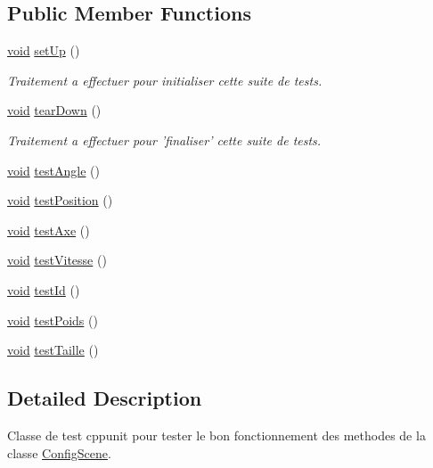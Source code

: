 \subsection*{Public Member Functions}
\begin{DoxyCompactItemize}
\item 
\hyperlink{wglew_8h_aeea6e3dfae3acf232096f57d2d57f084}{void} \hyperlink{group__inf2990_ga852614152af5bbd1217eb9daeccb0853}{set\-Up} ()
\begin{DoxyCompactList}\small\item\em Traitement a effectuer pour initialiser cette suite de tests. \end{DoxyCompactList}\item 
\hyperlink{wglew_8h_aeea6e3dfae3acf232096f57d2d57f084}{void} \hyperlink{group__inf2990_gadbbaf2e4b333b96d17c8c1ecdcb0094c}{tear\-Down} ()
\begin{DoxyCompactList}\small\item\em Traitement a effectuer pour 'finaliser' cette suite de tests. \end{DoxyCompactList}\item 
\hyperlink{wglew_8h_aeea6e3dfae3acf232096f57d2d57f084}{void} \hyperlink{group__inf2990_gac69cdb3bd02f6e9619db1c98fe2ad74a}{test\-Angle} ()
\item 
\hyperlink{wglew_8h_aeea6e3dfae3acf232096f57d2d57f084}{void} \hyperlink{group__inf2990_ga8dfd283eaafd040183f933e16c7cf9d3}{test\-Position} ()
\item 
\hyperlink{wglew_8h_aeea6e3dfae3acf232096f57d2d57f084}{void} \hyperlink{group__inf2990_gac9bfdb07899b15e44c4f96c13eb0a14e}{test\-Axe} ()
\item 
\hyperlink{wglew_8h_aeea6e3dfae3acf232096f57d2d57f084}{void} \hyperlink{group__inf2990_gac3309005ab38045a6b179cb23cf27876}{test\-Vitesse} ()
\item 
\hyperlink{wglew_8h_aeea6e3dfae3acf232096f57d2d57f084}{void} \hyperlink{group__inf2990_gaaeafd8d31bdb30cb0d25b590905616a3}{test\-Id} ()
\item 
\hyperlink{wglew_8h_aeea6e3dfae3acf232096f57d2d57f084}{void} \hyperlink{group__inf2990_gaddaf66dbd1eed412d12c88afc7cb31ca}{test\-Poids} ()
\item 
\hyperlink{wglew_8h_aeea6e3dfae3acf232096f57d2d57f084}{void} \hyperlink{group__inf2990_ga3442abc51b435aa7f65702696fc11d81}{test\-Taille} ()
\end{DoxyCompactItemize}


\subsection{Detailed Description}
Classe de test cppunit pour tester le bon fonctionnement des methodes de la classe \hyperlink{class_config_scene}{Config\-Scene}. 

